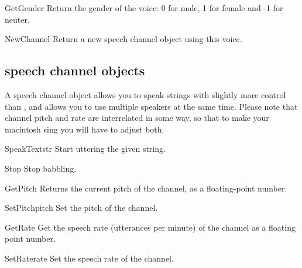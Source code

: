 \begin{funcdesc}{GetGender}{}
Return the gender of the voice: 0 for male, 1 for female and -1 for neuter.
\end{funcdesc}

\begin{funcdesc}{NewChannel}{}
Return a new speech channel object using this voice.
\end{funcdesc}

\subsection{speech channel objects}
A speech channel object allows you to speak strings with slightly more
control than , and allows you to use multiple
speakers at the same time. Please note that channel pitch and rate are
interrelated in some way, so that to make your macintosh sing you will
have to adjust both.

\renewcommand{\indexsubitem}{(speech channel object method)}
\begin{funcdesc}{SpeakText}{str}
Start uttering the given string.
\end{funcdesc}

\begin{funcdesc}{Stop}{}
Stop babbling.
\end{funcdesc}

\begin{funcdesc}{GetPitch}{}
Returns the current pitch of the channel, as a floating-point number.
\end{funcdesc}

\begin{funcdesc}{SetPitch}{pitch}
Set the pitch of the channel.
\end{funcdesc}

\begin{funcdesc}{GetRate}{}
Get the speech rate (utterances per minute) of the channel as a
floating point number.
\end{funcdesc}

\begin{funcdesc}{SetRate}{rate}
Set the speech rate of the channel.
\end{funcdesc}

